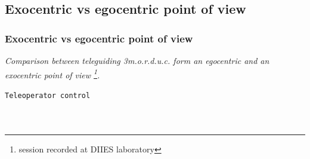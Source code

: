 \subsection{Exocentric vs egocentric point of view}
\frame
{
  \frametitle{Exocentric vs egocentric point of view}
  
  \emph{Comparison between teleguiding \textit{3m.o.r.d.u.c.}
    form an egocentric and an exocentric point of view
    \footnote{\tiny{session recorded at DIIES laboratory}}.}
  \pause

  \begin{block} {\alert{\texttt{Teleoperator control}}}

    \begin{columns}
      
       {   
        }
\end{columns}
\end{block}}
